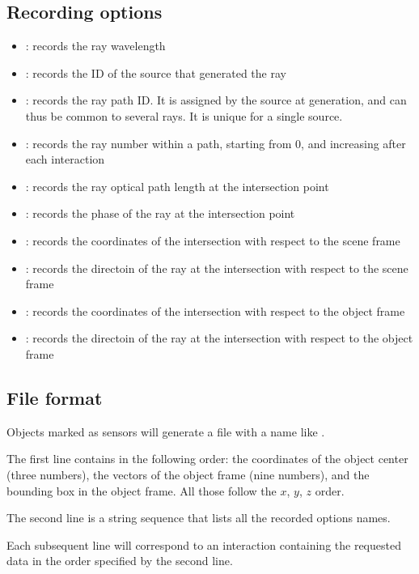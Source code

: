 \subsection{Recording options}

\begin{itemize}
	\item {}: records the ray wavelength
	\item {}: records the ID of the source that generated the ray
	\item {}: records the ray path ID. It is assigned by the source at generation, and can thus be common to several rays. It is unique for a single source.
	\item {}: records the ray number within a path, starting from 0, and increasing after each interaction
	\item {}: records the ray optical path length at the intersection point
	\item {}: records the phase of the ray at the intersection point
	\item {}: records the coordinates of the intersection with respect to the scene frame
	\item {}: records the directoin of the ray at the intersection with respect to the scene frame
	\item {}: records the coordinates of the intersection with respect to the object frame
	\item {}: records the directoin of the ray at the intersection with respect to the object frame
\end{itemize}

\subsection{File format}

Objects marked as sensors will generate a file with a name like .

The first line contains in the following order: the coordinates of the object center (three numbers), the vectors of the object frame (nine numbers), and the bounding box in the object frame. All those follow the $x$, $y$, $z$ order.

The second line is a string sequence that lists all the recorded options names.

Each subsequent line will correspond to an interaction containing the requested data in the order specified by the second line.

